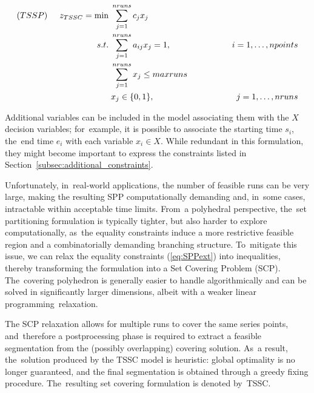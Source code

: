 \documentclass[mathematics,article,accept,pdftex,moreauthors]{Definitions/mdpi}
\begin{document}
\begin{alignat}{4}
	(TSSP) \hspace{0.5cm} z_{TSSC} = \min &\; \sum_{j=1}^{nruns} c_j x_{j}  \label{eq:SCPobj} \\
	s.t. &\; \sum_{j=1}^{nruns}a_{ij}x_{j} = 1, & \hspace{1.5cm} i=1,\dots,npoints  \label{eq:SCPcov} \\
	&\; \sum_{j=1}^{nruns} x_{j} \leq maxruns \label{eq:SPPext}\\
	&\; x_j \in \{0,1\}, &\; j=1,\dots,nruns  \label{eq:SCPvar}
\end{alignat}

Additional variables can be included in the model associating them with the $X$ decision variables; for~example, it is possible to associate the starting time $s_i$, the~end time $e_i$ with each variable $x_i \in X$. While redundant in this formulation, they might become important to express the constraints listed in Section~\ref{subsec:additional_constraints}.

Unfortunately, in~real-world applications, the number of feasible runs can be very large, making the resulting SPP computationally demanding and, in~some cases, intractable within acceptable time limits. From~a polyhedral perspective, the~set partitioning formulation is typically tighter, but also harder to explore computationally, as~the equality constraints induce a more restrictive feasible region and a combinatorially demanding branching structure. To~mitigate this issue, we can relax the equality constraints (\ref{eq:SPPext}) into inequalities, thereby transforming the formulation into a Set Covering Problem (SCP). The~covering polyhedron is generally easier to handle algorithmically and can be solved in significantly larger dimensions, albeit with a weaker linear programming~relaxation. 

{The SCP relaxation allows for multiple runs to cover the same series points, and~therefore a postprocessing phase is required to extract a feasible segmentation from the (possibly overlapping) covering solution. As~a result, the~solution produced by the TSSC model is heuristic: global optimality is no longer guaranteed, and the final segmentation is obtained through a  greedy fixing procedure. The~resulting set covering formulation is denoted by~TSSC.}
\end{document}
